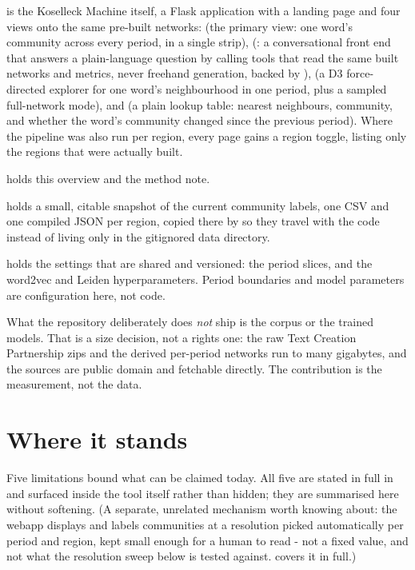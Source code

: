\documentclass[11pt]{article}
\begin{document}
 is the Koselleck Machine itself, a Flask
application with a landing page and four views onto the same pre-built
networks:  (the primary view: one word's community across
every period, in a single strip),  (: a
conversational front end that answers a plain-language question by
calling tools that read the same built networks and metrics, never
freehand generation, backed by ),  (a D3
force-directed explorer for one word's neighbourhood in one period,
plus a sampled full-network mode), and  (a plain lookup
table: nearest neighbours, community, and whether the word's community
changed since the previous period). Where the pipeline was also run
per region, every page gains a region toggle, listing only the regions
that were actually built.

 holds this overview and the method note.

 holds a small, citable snapshot of the current
community labels, one CSV and one compiled JSON per region, copied there
by  so they travel with the code
instead of living only in the gitignored data directory.

 holds the settings that are shared and
versioned: the period slices, and the word2vec and Leiden
hyperparameters. Period boundaries and model parameters are configuration
here, not code.

What the repository deliberately does \emph{not} ship is the corpus or
the trained models. That is a size decision, not a rights one: the raw
Text Creation Partnership zips and the derived per-period networks run to
many gigabytes, and the sources are public domain and fetchable directly.
The contribution is the measurement, not the data.

\section{Where it stands}
\label{sec:status}

Five limitations bound what can be claimed today. All five are stated
in full in  and surfaced inside the tool itself
rather than hidden; they are summarised here without softening. (A
separate, unrelated mechanism worth knowing about: the webapp displays
and labels communities at a resolution picked automatically per period
and region, kept small enough for a human to read - not a fixed value,
and not what the resolution sweep below is tested against.
 covers it in full.)
\end{document}
